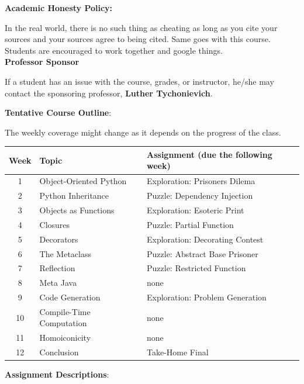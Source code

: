 \documentclass[11pt]{article}
\begin{document}
\textbf {\large Academic Honesty Policy:} 

In the real world, there is no such thing as cheating as long as you cite your sources and your sources agree to being cited. Same goes with this course. Students are encouraged to work together and google things. 
\\

\textbf {\large Professor Sponsor}

If a student has an issue with the course, grades, or instructor, he/she may contact the sponsoring professor, \textbf{Luther Tychonievich}.

\newpage
\textbf {\large Tentative Course Outline}:

The weekly coverage might change as it depends on the progress of the class. 

\begin{center}
\begin{tabular}{c | l | l}
\textbf{Week} & \textbf{Topic} & \textbf{Assignment} (due the following week)  \\
\hline 1 & Object-Oriented Python  & Exploration: Prisoners Dilema \\
2 & Python Inheritance & Puzzle: Dependency Injection \\
3 & Objects as Functions & Exploration: Esoteric Print  \\
4 & Closures & Puzzle: Partial Function\\
5 & Decorators & Exploration: Decorating Contest\\
6 & The Metaclass &  Puzzle: Abstract Base Prisoner\\
7 & Reflection & Puzzle: Restricted Function \\
8 & Meta Java & none \\
9 & Code Generation & Exploration: Problem Generation \\
10 & Compile-Time Computation &  none\\
11 & Homoiconicity &  none \\
12 & Conclusion & Take-Home Final
\end{tabular}
\end{center}

\vspace{10mm}

\textbf {\large Assignment Descriptions}:
\end{document}
